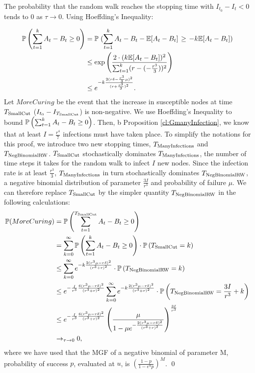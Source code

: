 \begin{lemma}\label{lem:MoreCures}
The probability that the random walk reaches the stopping time with $I_{t_0} - I_t < 0$ tends to 0 as $\tau \to 0$.
\proof Using Hoeffding's Inequality: 

\begin{align*}  
\mathbb{P} \left(\sum_{t=1}^{k} A_t - B_t \geq 0 \right) &= \mathbb{P} \left.(\sum_{t=1}^{k} A_t - B_t - \mathbb{E}[A_t - B_t] \right. \geq  \left.- k\mathbb{E}[A_t - B_t] \right)  \\
&\leq \exp  \left(\frac{2\cdot ( k\mathbb{E}[A_t - B_t])^2}{\sum_{t=1}^{k} (r - (-\frac{r^3}{3}))^2} \right) \\
&\leq e^{-k  \frac{2(r\delta - \frac{r^3}{3}\mu)^2}{(r + \frac{r^3}{3})^2} }.
\end{align*}
Let $MoreCuring$ be the event that the increase in susceptible nodes at time $T_{\rm SmallCut}$ ($I_{t_0} - I_{T_{\rm SmallCut}}$)  is non-negative. We use Hoeffding's Inequality to bound $\mathbb{P} \left(\sum_{t=1}^{k} A_t - B_t \geq 0 \right)$. Then, b Proposition \ref{cl:GmanyInfection}, we know that at least $I = \frac{r^4}{7}$ infections must have taken place. To simplify the notations for this proof, we introduce two new stopping times, $T_{\rm Many Infections}$ and $T_{\rm Neg Binomial RW}$. $T_{\rm Small Cut}$ stochastically dominates $T_{\rm Many Infections}$, the number of time steps it takes for the random walk to infect $I$ new nodes. Since the infection rate is at least $\frac{r^3}{3}$,  $T_{\rm Many Infections}$ in turn stochastically dominates $T_{\rm Neg Binomial RW}$, a negative binomial distribution of parameter $\frac{3I}{r^3}$ and probability of failure $\mu$. We can therefore replace $T_{\rm Small Cut}$ by the simpler quantity $T_{\rm Neg Binomial RW}$ in the following calculations: 
\begin{align*}
\mathbb{P}(MoreCuring) &= \mathbb{P} \left(\sum_{t=1}^{T_{\rm Small Cut}} A_t - B_t \geq 0 \right) \\
&= \sum_{k=0}^{\infty} \mathbb{P} \left(\sum_{t=1}^{k} A_t - B_t \geq 0 \right) \cdot \mathbb{P} \left(T_{\rm Small Cut} = k \right) \\
&\leq \sum_{k=0}^{\infty} e^{-k  \frac{2(r^3\mu - r\delta)^2}{(r^3 + r)^2} } \cdot \mathbb{P} \left(T_{\rm Neg Binomial RW} = k \right) \\
&\leq e^{-\frac{I}{r^3}  \frac{6(r^3\mu - r\delta)^2}{(r^3 + r)^2} } \sum_{k=0}^{\infty} e^{-k  \frac{2(r^3\mu - r\delta)^2}{(r^3 + r)^2} } \cdot \mathbb{P} \left(T_{\rm Neg Binomial RW} = \frac{3I}{r^3} + k \right) \\
&\leq e^{-\frac{I}{r^3}  \frac{6(r^3\mu - r\delta)^2}{(r^3 + r)^2} } \left( \frac{\mu}{1-\mu e^{- \frac{2(r^3\mu - r\delta)^2}{(r^3 + r)^2} }} \right)^\frac{3I}{r^3} \\
&\to_{\tau \to 0} 0,
\end{align*}
where we have used that the MGF of a negative binomial of parameter M, probability of success $p$, evaluated at $u$, is $\left( \frac{1-p}{1-e^up} \right)^M $.
\qed
\end{lemma}

